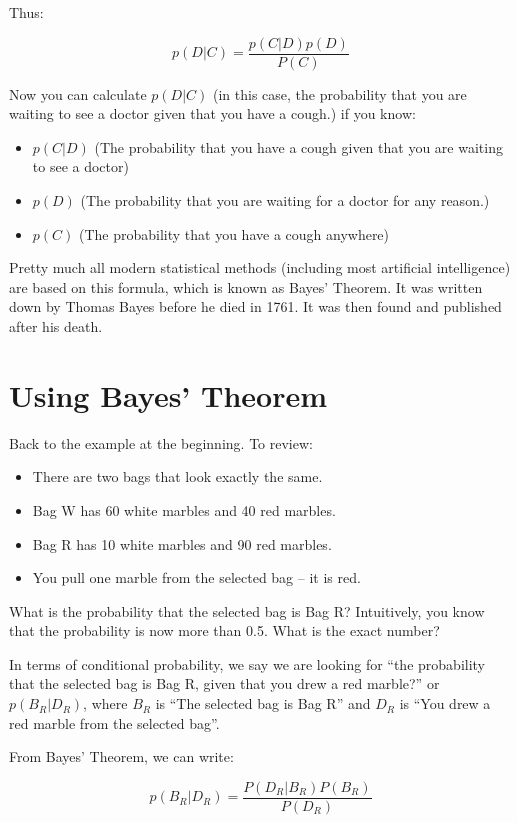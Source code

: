 Thus:

$$p(D | C) = \frac {p(C | D)p(D)}{P(C)}$$

Now you can calculate $p(D | C)$ (in this case, the probability that
you are waiting to see a doctor given that you have a cough.) if you
know:

\begin{itemize}
\item $p(C | D)$ (The probability that you have a cough given that you are waiting to see a doctor)
\item $p(D)$ (The probability that you are waiting for a doctor for any reason.)
\item $p(C)$ (The probability that you have a cough anywhere)
\end{itemize}

Pretty much all modern statistical methods (including most artificial
intelligence) are based on this formula, which is known as Bayes'
Theorem. It was written down by Thomas Bayes before he died in
1761. It was then found and published after his death.

\section{Using Bayes' Theorem}

Back to the example at the beginning. To review:

\begin{itemize}
\item There are two bags that look exactly the same.
\item Bag W has 60 white marbles and 40 red marbles.
\item Bag R has 10 white marbles and 90 red marbles.
\item You pull one marble from the selected bag -- it is red.
\end{itemize}

What is the probability that the selected bag is Bag R? Intuitively,
you know that the probability is now more than 0.5. What is the exact
number?

In terms of conditional probability, we say we are looking for ``the probability
that the selected bag is Bag R, given that you drew a red marble?'' or
$p(B_R | D_R)$, where $B_R$ is ``The selected bag is Bag R'' and $D_R$ is
``You drew a red marble from the selected bag''.

From Bayes' Theorem, we can write:

$$p(B_R | D_R) = \frac{ P(D_R | B_R) P(B_R) } {P(D_R)}$$

